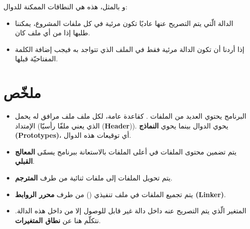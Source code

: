 و بالمثل، هذه هي النطاقات الممكنة للدوال:

\begin{itemize}
  \item الدالة الّتي يتم التصريح عنها عاديًا تكون مرئية في كل ملفات المشروع، يمكننا طلبها إذا من أي ملف كان.
  \item إذا أردنا أن تكون الدالة مرئية فقط في الملف الذي تتواجد به فيجب إضافة الكلمة المفتاحيّة
قبلها.
\end{itemize}

\section*{ملخّص}

\begin{itemize}
  \item البرنامج يحتوي العديد من الملفات
.
كقاعدة عامة، لكل ملف
ملف مرافق له يحمل الإمتداد
(الذي يعني ملفّا رأسيّا
(\textbf{\textenglish{Header}})).
يحوي الدوال بينما
يحوي
\textbf{النماذج (\textenglish{Prototypes})}،
أي توقيعات هذه الدوال.
  \item يتم تضمين محتوى الملفات
في أعلى الملفات
بالاستعانة ببرنامج يسمّى
\textbf{المعالج القبلي}.
  \item يتم تحويل الملفات
إلى ملفات ثنائية
من طرف
\textbf{المترجم}.
  \item يتم تجميع الملفات
في ملف تنفيذي
()
من طرف
\textbf{محرر الروابط
(\textenglish{Linker})}.
  \item المتغير الّذي يتم التصريح عنه داخل دالة غير قابل للوصول إلا من داخل هذه الدالة. نتكلّم هنا عن
\textbf{نطاق المتغيرات}.
\end{itemize}
